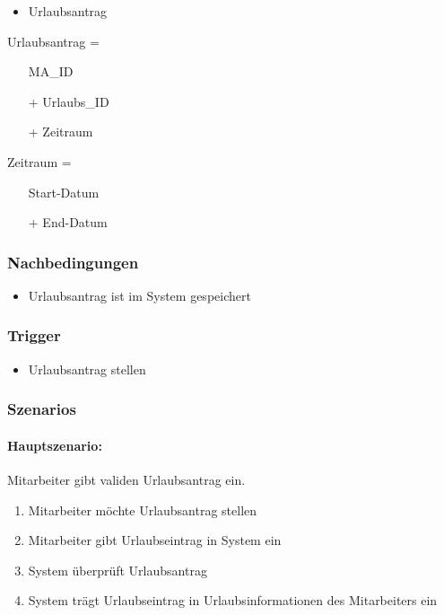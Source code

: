 \begin{itemize}
\item Urlaubsantrag
\end{itemize}

Urlaubsantrag =
\begin{itemize}
\item[] MA\_ID
\item[+] Urlaubs\_ID
\item[+] Zeitraum
\end{itemize}

Zeitraum = 
\begin{itemize}
\item[] Start-Datum
\item[+] End-Datum
\end{itemize}

\subsubsection{Nachbedingungen}
\begin{itemize}
\item Urlaubsantrag ist im System gespeichert
\end{itemize}

\subsubsection{Trigger}
\begin{itemize}
\item Urlaubsantrag stellen
\end{itemize}

\subsubsection{Szenarios}

\paragraph{Hauptszenario:} Mitarbeiter gibt validen Urlaubsantrag ein.
\begin{enumerate}
\item Mitarbeiter möchte Urlaubsantrag stellen
\item Mitarbeiter gibt Urlaubseintrag in System ein
\item System überprüft Urlaubsantrag
\item System trägt Urlaubseintrag in Urlaubsinformationen des Mitarbeiters ein
\end{enumerate}

